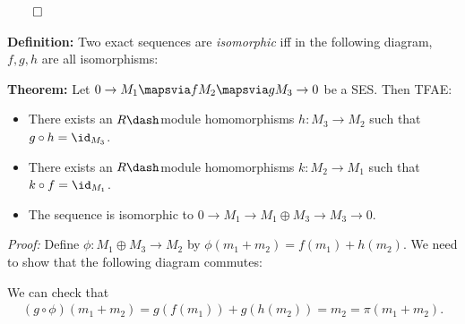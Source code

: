 \(\qed\)

\textbf{Definition:} Two exact sequences are \emph{isomorphic} iff in
the following diagram, \(f,g,h\) are all isomorphisms:

\begin{center}
\end{center}

\textbf{Theorem:} Let \(0 \to M_1 \mapsvia f M_2 \mapsvia g M_3 \to 0\)
be a SES. Then TFAE:

\begin{itemize}
\item
  There exists an \(R\dash\)module homomorphisms \(h: M_3 \to M_2\) such
  that \(g\circ h = \id_{M_3}\).
\item
  There exists an \(R\dash\)module homomorphisms \(k: M_2 \to M_1\) such
  that \(k\circ f = \id_{M_1}\).
\item
  The sequence is isomorphic to
  \(0 \to M_1 \to M_1 \oplus M_3 \to M_3 \to 0\).
\end{itemize}

\emph{Proof:} Define \(\phi: M_1 \oplus M_3 \to M_2\) by
\(\phi(m_1 + m_2) = f(m_1) + h(m_2)\). We need to show that the
following diagram commutes:

\begin{center}
\end{center}

We can check that
\begin{align*}
(g\circ \phi)(m_1 + m_2) = g( f(m_1)) +  g(h(m_2)) = m_2 = \pi(m_1 + m_2).\end{align*}

